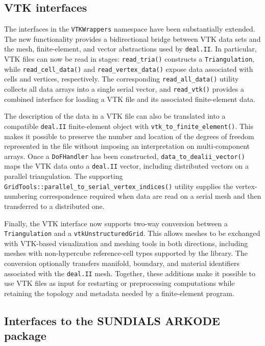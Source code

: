 \documentclass{ansarticle-preprint}
\newcommand{\specialword}[1]{\texttt{#1}}
\newcommand{\dealii}{{\specialword{deal.II}}\xspace}
\begin{document}
\subsection{VTK interfaces}
\label{subsec:vtk}

The interfaces in the \texttt{VTKWrappers} namespace have been
substantially extended.  The new functionality provides a bidirectional
bridge between VTK data sets and the mesh, finite-element, and vector
abstractions used by \dealii.  In particular, VTK files can now be read in
stages: \texttt{read\_tria()} constructs a \texttt{Triangulation}, while
\texttt{read\_cell\_data()} and \texttt{read\_vertex\_data()} expose data
associated with cells and vertices, respectively.  The corresponding
\texttt{read\_all\_data()} utility collects all data arrays into a single
serial vector, and \texttt{read\_vtk()} provides a combined interface for
loading a VTK file and its associated finite-element data.

The description of the data in a VTK file can also be translated into a
compatible \dealii{} finite-element object with
\texttt{vtk\_to\_finite\_element()}.  This makes it possible to preserve
the number and location of the degrees of freedom represented in the file
without imposing an interpretation on multi-component arrays.  Once a
\texttt{DoFHandler} has been constructed, \texttt{data\_to\_dealii\_vector()}
maps the VTK data onto a \dealii{} vector, including distributed vectors on a
parallel triangulation.  The supporting
\texttt{GridTools::parallel\_to\_serial\_vertex\_indices()} utility supplies
the vertex-numbering correspondence required when data are read on a
serial mesh and then transferred to a distributed one.

Finally, the VTK interface now supports two-way conversion between a
\texttt{Triangulation} and a \texttt{vtkUnstructuredGrid}.  This allows
meshes to be exchanged with VTK-based visualization and meshing tools in
both directions, including meshes with non-hypercube reference-cell
types supported by the library.  The conversion optionally transfers
manifold, boundary, and material identifiers associated with the \dealii{}
mesh.  Together, these additions make it possible to use VTK files as input for restarting or
preprocessing computations while retaining the topology and metadata
needed by a finite-element program.


\subsection{Interfaces to the SUNDIALS ARKODE package}
\label{subsec:arkode}
\end{document}
